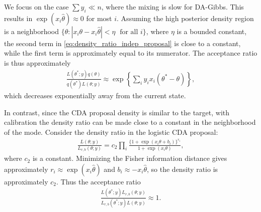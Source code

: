 \documentclass[twoside,11pt]{article}
\newcommand{\mc}[1]{\mathcal{#1}}
\newcommand{\1}{\mathbf 1}
\begin{document}
{We focus on the case $\sum y_i \ll n$, where  the mixing is slow for DA-Gibbs.  This results in $\exp(x_i\hat\theta)\approx 0$ for most $i$.  Assuming the high posterior density region is a neighborhood $\{ \theta:|x_i \theta-x_i \hat\theta  |< \eta \;\text{ for all } i \}$, where $\eta$ is a bounded constant, the second term in \eqref{eq:density_ratio_indep_proposal} is close to a constant, while the first term is approximately equal to its numerator. The acceptance ratio is thus approximately
\begin{equation*}
	\begin{aligned}
	\frac{L(\theta^*;y)q(\theta)}{q(\theta^*)L(\theta;y)}
	  \approx  \exp \left \{   \sum_i y_i x_i (\theta^* - \theta ) \right\},
    \end{aligned}
\end{equation*}
 which decreases exponentially away from the current state. 
 

In contrast, since the CDA proposal density is similar to the target, with calibration the density ratio can be made close to a constant in the neighborhood of the mode. Consider the density ratio in the logistic CDA proposal:
\begin{equation*}
	\begin{aligned}
    \frac{L(\theta;y)}{L_{r,b}(\theta;y)} =
    c_2 \prod_i \frac{ \{ 1+\exp( x_i\theta+b_i)\}^{r_i}}{1+\exp( x_i\theta)},
    \end{aligned}
\end{equation*}
where $c_2$ is a constant.  Minimizing the Fisher information distance gives approximately $r_i\approx\exp(x_i\hat\theta)$ and $b_i \approx -x_i\hat\theta$, so the density ratio is approximately $c_2$. Thus the acceptance ratio
\begin{equation*}
	\begin{aligned}
	\frac{L(\theta^*;y)L_{r,b}(\theta;y)}{L_{r,b}(\theta^*;y)L(\theta;y)}
	  \approx  1.
    \end{aligned}
\end{equation*}


}
\end{document}

